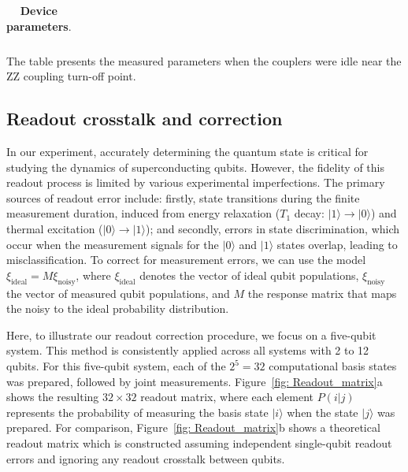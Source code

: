 \documentclass[aps,prl,epsfigure,twocolumn,superscriptaddress]{revtex4-2}
\newcommand{\1}{\mathbbm{1}}
\newcommand{\SubFig}[2]{\ref{#1}{\color{blue}#2}}
\begin{document}
\begin{table}[htp]
\begin{threeparttable}
\begin{tabular}{|c|c|c|c|c|c|c|c|c|c|c|c|c|}
			\hline
			\hline
		\end{tabular}

		\begin{tablenotes}
			\footnotesize

			\item[a]  The table presents the measured parameters when the couplers were idle near the ZZ coupling turn-off point.

		\end{tablenotes}
	\end{threeparttable}
	\caption{\textbf{Device parameters}.}
	\label{table:Device}
\end{table}

\subsection{Readout crosstalk and correction}

In our experiment, accurately determining the quantum state is critical for studying the dynamics of superconducting qubits. However, the fidelity of this readout process is limited by various experimental imperfections. The primary sources of readout error include: firstly, state transitions during the finite measurement duration, induced from energy relaxation ($T_1$ decay: $|1\rangle \to |0\rangle$) and thermal excitation ($|0\rangle \to |1\rangle$); and secondly, errors in state discrimination, which occur when the measurement signals for the $|0\rangle$ and $|1\rangle$ states overlap, leading to misclassification.
To correct for measurement errors, we can use the model $\xi_{\text{ideal}} = M \xi_{\text{noisy}}$, where $\xi_{\text{ideal}}$ denotes the vector of ideal qubit populations, $\xi_{\text{noisy}}$ the vector of measured qubit populations, and $M$ the response matrix that maps the noisy to the ideal probability distribution.

Here, to illustrate our readout correction procedure, we focus on a five-qubit system. This method is consistently applied across all systems with 2 to 12 qubits. For this five-qubit system, each of the $2^5=32$ computational basis states was prepared, followed by joint measurements. Figure~\SubFig{fig: Readout_matrix}{a} shows the resulting $32 \times 32$ readout matrix, where each element $P(i|j)$ represents the probability of measuring the basis state $|i\rangle$ when the state $|j\rangle$ was prepared. For comparison, Figure~\SubFig{fig: Readout_matrix}{b} shows a theoretical readout matrix which is constructed assuming independent single-qubit readout errors and ignoring any readout crosstalk between qubits.
\end{document}
